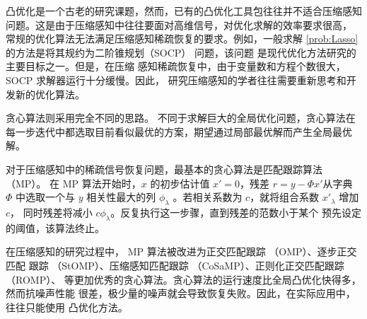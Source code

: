 凸优化是一个古老的研究课题，然而，已有的凸优化工具包往往并不适合压缩感知
问题。这是由于压缩感知中往往要面对高维信号，对优化求解的效率要求很高，
常规的优化算法无法满足压缩感知稀疏恢复的要求。例如，一般求解
\ref{prob:Lasso} 的方法是将其规约为二阶锥规划（SOCP） 问题，该问题
是现代优化方法研究的主要目标之一。但是，在压缩
感知稀疏恢复中，由于变量数和方程个数很大，SOCP 求解器运行十分缓慢。因此，
研究压缩感知的学者往往需要重新思考和开发新的优化算法。

贪心算法则采用完全不同的思路。 不同于求解巨大的全局优化问题，贪心算法在
每一步迭代中都选取目前看似最优的方案，期望通过局部最优解而产生全局最优解。

对于压缩感知中的稀疏信号恢复问题，最基本的贪心算法是匹配跟踪算法
（MP）。 在 MP 算法开始时，$x$ 的初步估计值 $x' = 0$，残差
$r = y - \Phi x'$从字典 $\Phi$ 中选取一个与 $y$ 相关性最大的列
$\phi_\lambda$ 。若相关系数为 $c$，就将组合系数 $x'_\lambda$ 增加 $c$，
同时残差将减小 $c \phi_\lambda$。反复执行这一步骤，直到残差的范数小于某个
预先设定的阈值，该算法终止。

在压缩感知的研究过程中， MP 算法被改进为正交匹配跟踪 （OMP）、逐步正交匹配
跟踪 （StOMP）、压缩感知匹配跟踪 （CoSaMP）、正则化正交匹配跟踪 （ROMP）、
等更加优秀的贪心算法。贪心算法的运行速度比全局凸优化快得多，然而抗噪声性能
很差，极少量的噪声就会导致恢复失败。因此，在实际应用中，往往只能使用
凸优化方法。
